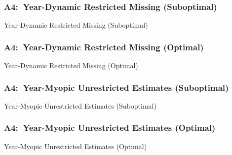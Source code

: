 \documentclass[12pt, aspectratio=169]{beamer}
\begin{document}
\begin{frame}[label=ydrms]
\frametitle{A4:\ Year-Dynamic Restricted Missing (Suboptimal)}
\begin{table}[htbp]
  \centering
  \renewcommand{\thetable}{\arabic{table}a}
  \caption{Year-Dynamic Restricted Missing (Suboptimal)}
  \vspace{5pt}
  \begin{adjustbox}{totalheight=.7\textheight}

  \end{adjustbox}
\end{table}%
\hyperlink{ysres}{}
\end{frame}

\begin{frame}[label=ydrmo]
\frametitle{A4:\ Year-Dynamic Restricted Missing (Optimal)}
\addtocounter{framenumber}{-1}
\begin{table}[htbp]
  \centering
  \addtocounter{table}{-1}
  \renewcommand{\thetable}{\arabic{table}b}
  \caption{Year-Dynamic Restricted Missing (Optimal)}
  \vspace{5pt}
  \begin{adjustbox}{totalheight=.7\textheight}

  \end{adjustbox}
\end{table}%
\hyperlink{ysreo}{}
\end{frame}

\begin{frame}[label=ymues]
\frametitle{A4:\ Year-Myopic Unrestricted Estimates (Suboptimal)}
\begin{table}[htbp]
  \centering
  \renewcommand{\thetable}{\arabic{table}a}
  \caption{Year-Myopic Unrestricted Estimates (Suboptimal)}
  \vspace{5pt}
  \begin{adjustbox}{totalheight=.7\textheight}

  \end{adjustbox}
\end{table}%
\hyperlink{ydues}{}
\end{frame}

\begin{frame}[label=ymueo]
\frametitle{A4:\ Year-Myopic Unrestricted Estimates (Optimal)}
\addtocounter{framenumber}{-1}
\begin{table}[htbp]
  \centering
  \addtocounter{table}{-1}
  \renewcommand{\thetable}{\arabic{table}b}
  \caption{Year-Myopic Unrestricted Estimates (Optimal)}
  \vspace{5pt}
  \begin{adjustbox}{totalheight=.7\textheight}

  \end{adjustbox}
\end{table}%
\hyperlink{ydueo}{}
\end{frame}
\end{document}
